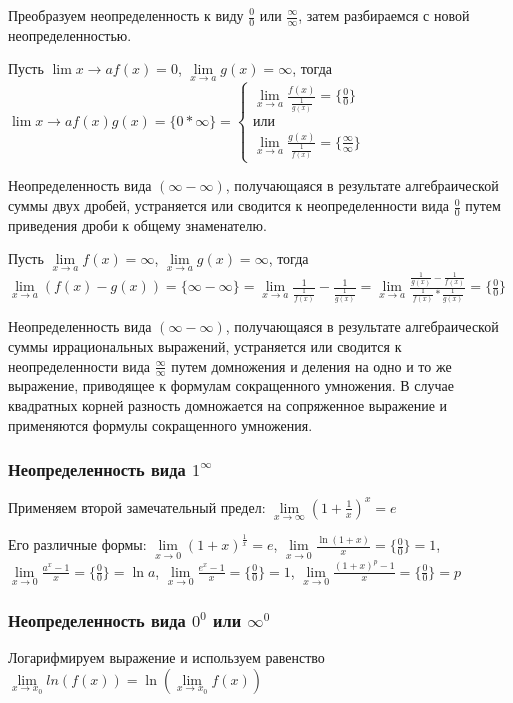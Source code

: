 \documentclass{article}
\begin{document}
\begin{flushleft}
Преобразуем неопределенность к виду $\frac{0}{0}$ или $\frac{\infty}{\infty}$, затем разбираемся с новой неопределенностью.

\hfill

Пусть $\lim\limits{x \to a} f(x) = 0$, $\lim\limits_{x \to a} g(x) = \infty$, тогда $\lim\limits{x \to a} f(x) g(x) = \{ 0 * \infty \} = \begin{cases}
    \lim\limits_{x \to a} \frac{f(x)}{\frac{1}{g(x)}} = \{ \frac{0}{0} \} \\
    \textbf{или} \\
    \lim\limits_{x \to a} \frac{g(x)}{\frac{1}{f(x)}} = \{ \frac{\infty}{\infty} \}
\end{cases}$

\hfill

Неопределенность вида $(\infty - \infty)$, получающаяся в результате алгебраической суммы двух дробей, устраняется или сводится к неопределенности вида $\frac{0}{0}$ путем приведения дроби к общему знаменателю.

Пусть $\lim\limits_{x \to a} f(x) = \infty$, $\lim\limits_{x \to a} g(x) = \infty$, тогда $\lim\limits_{x \to a} (f(x) - g(x)) = \{ \infty - \infty \} = \lim\limits_{x \to a} \frac{1}{\frac{1}{f(x)}} - \frac{1}{\frac{1}{g(x)}} = \lim\limits_{x \to a} \frac{\frac{1}{g(x)} - \frac{1}{f(x)}}{\frac{1}{f(x)} * \frac{1}{g(x)}} = \{ \frac{0}{0} \}$

\hfill

Неопределенность вида $(\infty - \infty)$, получающаяся в результате алгебраической суммы иррациональных выражений, устраняется или сводится к неопределенности вида $\frac{\infty}{\infty}$ путем домножения и деления на одно и то же выражение, приводящее к формулам сокращенного умножения. В случае квадратных корней разность домножается на сопряженное выражение и применяются формулы сокращенного умножения.

\subsubsection{Неопределенность вида $1^{\infty}$}

Применяем второй замечательный предел: $\lim\limits_{x \to \infty} (1 + \frac{1}{x})^x = e$

Его различные формы: $\lim\limits_{x \to 0} (1 + x)^{\frac{1}{x}} = e$, $\lim\limits_{x \to 0} \frac{\ln (1 + x)}{x} = \{ \frac{0}{0} \} = 1$, $\lim\limits_{x \to 0} \frac{a^x - 1}{x} = \{ \frac{0}{0} \} = \ln a$, $\lim\limits_{x \to 0} \frac{e^x - 1}{x} = \{ \frac{0}{0} \} = 1$, $\lim\limits_{x \to 0} \frac{(1 + x)^p - 1}{x} = \{ \frac{0}{0} \} = p$

\subsubsection{Неопределенность вида $0^0$ или $\infty^0$}

Логарифмируем выражение и используем равенство $\lim\limits_{x \to x_0} ln(f(x)) = \ln (\lim\limits_{x \to x_0} f(x))$

\end{flushleft}
\end{document}
